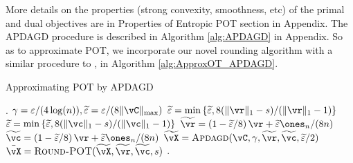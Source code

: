 More details on the properties (strong convexity, smoothness, etc) of the primal and dual objectives are in Properties of Entropic POT section in Appendix. The APDAGD procedure is described in Algorithm \ref{alg:APDAGD} in Appendix. So as to approximate POT, we incorporate our novel rounding algorithm with a similar procedure to \citep[Algorithm 2]{lin2019efficient}, in Algorithm \ref{alg:ApproxOT_APDAGD}.
\begin{algorithm}
\caption{Approximating POT by APDAGD} \label{alg:ApproxOT_APDAGD}
\begin{algorithmic}[1]
    .
    \STATE $\gamma = \varepsilon / (4\log(n)), \widetilde{\varepsilon}= \varepsilon / (8\|\vC\|_{\max})$
        \STATE \(\widetilde{\varepsilon} = \min\left\{\widetilde{\varepsilon}, 8 (\|\vr\|_1-s) / (\|\vr\|_1-1) \right\} \)
    \ENDIF
        \STATE \(\widetilde{\varepsilon} = \min\left\{\widetilde{\varepsilon}, 8 (\|\vc\|_1-s) / (\|\vc\|_1-1) \right\} \)
    \ENDIF
    \STATE $\widetilde{\vr} = \left(1 - \widetilde{\varepsilon}/ 8\right)\vr + \widetilde{\varepsilon} \ones_n / (8n)$
    \STATE $\widetilde{\vc} = \left(1 - \widetilde{\varepsilon}/ 8\right)\vr + \widetilde{\varepsilon} \ones_n / (8n)$
    \STATE $\widetilde{\vX} = \textsc{Apdagd}(\vC, \gamma, \widetilde{\vr}, \widetilde{\vc}, \widetilde{\varepsilon}/2)$
    \STATE $\bar{\vX} = \textsc{Round-POT}(\widetilde{\vX}, \widetilde{\vr}, \widetilde{\vc}, s)$
    \ENSURE{$\bar{\vX}$}.  
\end{algorithmic}
\end{algorithm}
